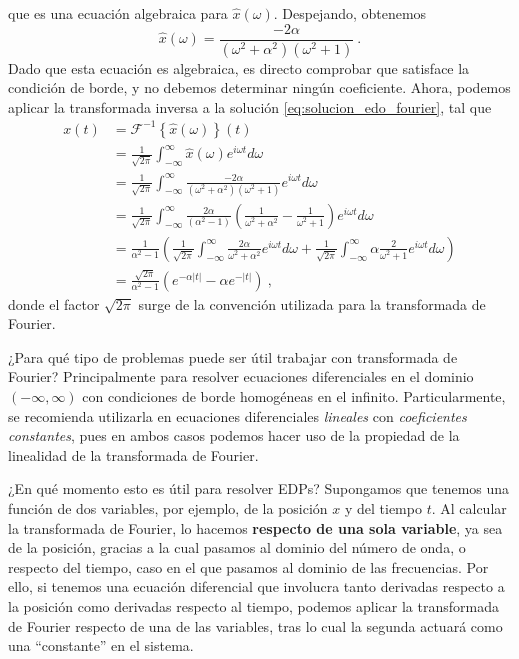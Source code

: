 \begin{ejemplo}
\begin{equation}
    \end{equation}
    que es una ecuación algebraica para $\hat{x}(\omega)$. Despejando, obtenemos
    \begin{equation} \label{eq:solucion_edo_fourier}
        \hat{x}(\omega) = \frac{-2\alpha}{(\omega^2 + \alpha^2) (\omega^2 + 1)} \ .
    \end{equation}
    Dado que esta ecuación es algebraica, es directo comprobar que satisface la condición de borde, y no debemos determinar ningún coeficiente. Ahora, podemos aplicar la transformada inversa a la solución \eqref{eq:solucion_edo_fourier}, tal que
    \begin{align}
        x(t) & = \mathcal{F}^{-1} \left\{ \hat{x}(\omega) \right\} (t) \nonumber \\
        & = \frac{1}{\sqrt{2\pi}} \int_{-\infty}^\infty \hat{x}(\omega) e^{i\omega t} d\omega \nonumber \\
        & = \frac{1}{\sqrt{2\pi}} \int_{-\infty}^\infty \frac{-2\alpha}{(\omega^2 + \alpha^2) (\omega^2 + 1)} e^{i\omega t} d\omega \nonumber \\
        & = \frac{1}{\sqrt{2\pi}} \int_{-\infty}^\infty \frac{2\alpha}{(\alpha^2 - 1)} \left( \frac{1}{\omega^2 + \alpha^2} - \frac{1}{\omega^2 + 1} \right) e^{i\omega t} d\omega \nonumber \\
        & = \frac{1}{\alpha^2 - 1} \left( \frac{1}{\sqrt{2\pi}} \int_{-\infty}^\infty \frac{2\alpha}{\omega^2 + \alpha^2} e^{i\omega t} d\omega + \frac{1}{\sqrt{2\pi}} \int_{-\infty}^\infty \alpha \frac{2}{\omega^2 + 1} e^{i\omega t} d\omega \right) \nonumber \\
        & = \frac{\sqrt{2\pi}}{\alpha^2-1} \left( e^{-\alpha |t|} - \alpha e^{-|t|} \right)\ ,
    \end{align}
    donde el factor $\sqrt{2\pi}$ surge de la convención utilizada para la transformada de Fourier.
\end{ejemplo}

¿Para qué tipo de problemas puede ser útil trabajar con transformada de Fourier? Principalmente para resolver ecuaciones diferenciales en el dominio $(-\infty, \infty)$ con condiciones de borde homogéneas en el infinito. Particularmente, se recomienda utilizarla en ecuaciones diferenciales \emph{lineales} con \emph{coeficientes constantes}, pues en ambos casos podemos hacer uso de la propiedad de la linealidad de la transformada de Fourier.

¿En qué momento esto es útil para resolver EDPs? Supongamos que tenemos una función de dos variables, por ejemplo, de la posición $x$ y del tiempo $t$. Al calcular la transformada de Fourier, lo hacemos \textbf{respecto de una sola variable}, ya sea de la posición, gracias a la cual pasamos al dominio del número de onda, o respecto del tiempo, caso en el que pasamos al dominio de las frecuencias. Por ello, si tenemos una ecuación diferencial que involucra tanto derivadas respecto a la posición como derivadas respecto al tiempo, podemos aplicar la transformada de Fourier respecto de una de las variables, tras lo cual la segunda actuará como una ``constante'' en el sistema.


